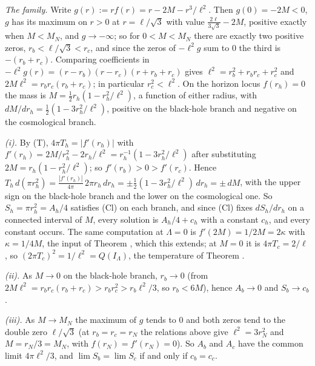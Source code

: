 \emph{The family.} Write $g(r) := r f(r) = r - 2M - r^{3}/\ell^{2}$. Then $g(0) = -2M < 0$, $g$ has its maximum on $r > 0$ at $r = \ell/\sqrt{3}$ with value $\tfrac{2\ell}{3\sqrt{3}} - 2M$, positive exactly when $M < M_{N}$, and $g \to -\infty$; so for $0 < M < M_{N}$ there are exactly two positive zeros, $r_{b} < \ell/\sqrt{3} < r_{c}$, and since the zeros of $-\ell^{2}g$ sum to $0$ the third is $-(r_{b} + r_{c})$. Comparing coefficients in $-\ell^{2}g(r) = (r - r_{b})(r - r_{c})(r + r_{b} + r_{c})$ gives $\ell^{2} = r_{b}^{2} + r_{b}r_{c} + r_{c}^{2}$ and $2M\ell^{2} = r_{b}r_{c}(r_{b} + r_{c})$; in particular $r_{c}^{2} < \ell^{2}$. On the horizon locus $f(r_{h}) = 0$ the mass is $M = \tfrac12 r_{h}(1 - r_{h}^{2}/\ell^{2})$, a function of either radius, with $dM/dr_{h} = \tfrac12(1 - 3r_{h}^{2}/\ell^{2})$, positive on the black-hole branch and negative on the cosmological branch.

\emph{(i).} By (T), $4\pi T_{h} = |f'(r_{h})|$ with $f'(r_{h}) = 2M/r_{h}^{2} - 2r_{h}/\ell^{2} = r_{h}^{-1}(1 - 3r_{h}^{2}/\ell^{2})$ after substituting $2M = r_{h}(1 - r_{h}^{2}/\ell^{2})$; so $f'(r_{b}) > 0 > f'(r_{c})$. Hence $T_{h}\,d(\pi r_{h}^{2}) = \tfrac{|f'(r_{h})|}{4\pi}\,2\pi r_{h}\,dr_{h} = \pm\tfrac12(1 - 3r_{h}^{2}/\ell^{2})\,dr_{h} = \pm\,dM$, with the upper sign on the black-hole branch and the lower on the cosmological one. So $S_{h} = \pi r_{h}^{2} = A_{h}/4$ satisfies (Cl) on each branch, and since (Cl) fixes $dS_{h}/dr_{h}$ on a connected interval of $M$, every solution is $A_{h}/4 + c_{h}$ with a constant $c_{h}$, and every constant occurs. The same computation at $\Lambda = 0$ is $f'(2M) = 1/2M = 2\kappa$ with $\kappa = 1/4M$, the input of Theorem , which this extends; at $M = 0$ it is $4\pi T_{c} = 2/\ell$, so $(2\pi T_{c})^{2} = 1/\ell^{2} = Q(I_{\Lambda})$, the temperature of Theorem .

\emph{(ii).} As $M \to 0$ on the black-hole branch, $r_{b} \to 0$ (from $2M\ell^{2} = r_{b}r_{c}(r_{b} + r_{c}) > r_{b}r_{c}^{2} > r_{b}\ell^{2}/3$, so $r_{b} < 6M$), hence $A_{b} \to 0$ and $S_{b} \to c_{b}$.

\emph{(iii).} As $M \to M_{N}$ the maximum of $g$ tends to $0$ and both zeros tend to the double zero $\ell/\sqrt{3}$ (at $r_{b} = r_{c} = r_{N}$ the relations above give $\ell^{2} = 3r_{N}^{2}$ and $M = r_{N}/3 = M_{N}$, with $f(r_{N}) = f'(r_{N}) = 0$). So $A_{b}$ and $A_{c}$ have the common limit $4\pi\ell^{2}/3$, and $\lim S_{b} = \lim S_{c}$ if and only if $c_{b} = c_{c}$.

